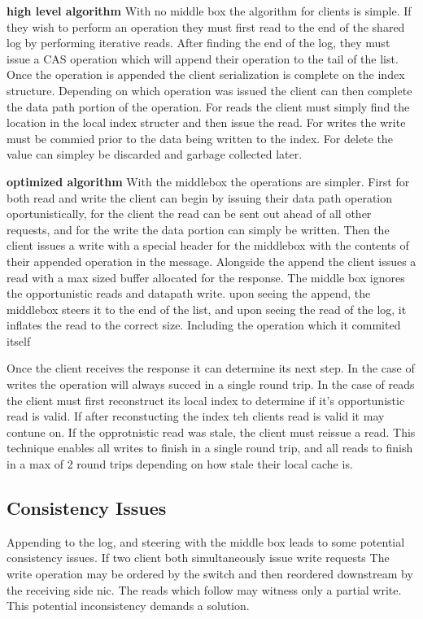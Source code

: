 \textbf{high level algorithm} With no middle box the
algorithm for clients is simple. If they wish to perform an
operation they must first read to the end of the shared log
by performing iterative reads. After finding the end of the
log, they must issue a CAS operation which will append their
operation to the tail of the list. Once the operation is
appended the client serialization is complete on the index
structure. Depending on which operation was issued the
client can then complete the data path portion of the
operation. For reads the client must simply find the
location in the local index structer and then issue the
read. For writes the write must be commied prior to the data
being written to the index. For delete the value can simpley
be discarded and garbage collected later.

\textbf{optimized algorithm} With the middlebox the
operations are simpler. First for both read and write the
client can begin by issuing their data path operation
oportunistically, for the client the read can be sent out
ahead of all other requests, and for the write the data
portion can simply be written. Then the client issues a
write with a special header for the middlebox with the
contents of their appended operation in the message.
Alongside the append the client issues a read with a max
sized buffer allocated for the response. The middle box
ignores the opportunistic reads and datapath write. upon
seeing the append, the middlebox steers it to the end of the
list, and upon seeing the read of the log, it inflates the
read to the correct size. Including the operation which it
commited itself

Once the client receives the response it can determine its
next step. In the case of writes the operation will always
succed in a single round trip. In the case of reads the
client must first reconstruct its local index to determine
if it's opportunistic read is valid. If after reconstucting
the index teh clients read is valid it may contune on. If
the opprotnistic read was stale, the client must reissue a
read. This technique enables all writes to finish in a
single round trip, and all reads to finish in a max of 2
round trips depending on how stale their local cache is.


\subsection{Consistency Issues}

Appending to the log, and steering with the middle box leads
to some potential consistency issues. If two client both
simultaneously issue write requests The write operation may
be ordered by the switch and then reordered downstream by
the receiving side nic. The reads which follow may witness
only a partial write. This potential inconsistency demands a solution.

